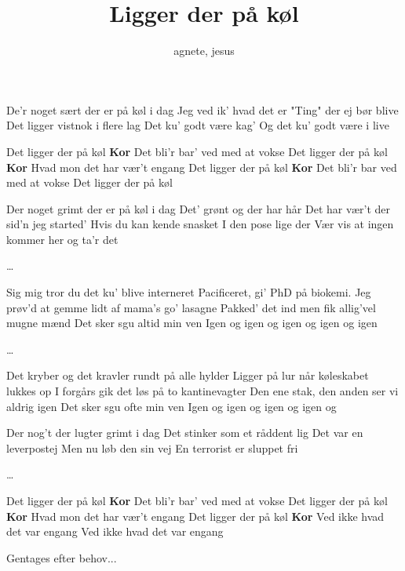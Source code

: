 \documentclass[danish]{article}
\title{Ligger der på køl}
\author{agnete, jesus}
\begin{document}
\twocolumn[
\maketitle
]

\begin{song}

 De'r noget sært der er på køl i dag
Jeg ved ik' hvad det er
"Ting" der ej bør blive
Det ligger vistnok i flere lag
Det ku' godt være kag'
Og det ku' godt være i live

 Det ligger der på køl
\textbf{Kor} Det bli'r bar' ved med at vokse
Det ligger der på køl
\textbf{Kor} Hvad mon det har vær't engang
Det ligger der på køl
\textbf{Kor} Det bli'r bar ved med at vokse
Det ligger der på køl

 Der noget grimt der er på køl i dag
Det' grønt og der har hår
Det har vær't der sid'n jeg started'
Hvis du kan kende snasket
I den pose lige der
Vær vis at ingen kommer her og ta'r det

 \ldots{}

 Sig mig tror du det ku' blive interneret
Pacificeret, gi' PhD på biokemi.
Jeg prøv'd at gemme lidt af mama's go' lasagne
Pakked' det ind men fik allig'vel mugne mænd
Det sker sgu altid min ven
Igen og igen og igen og igen og igen

 \ldots{}

 Det kryber og det kravler rundt på alle hylder
Ligger på lur når køleskabet lukkes op
I forgårs gik det løs på to kantinevagter
Den ene stak, den anden ser vi aldrig igen
Det sker sgu ofte min ven
Igen og igen og igen og igen og

 Der nog't der lugter grimt i dag
Det stinker som et råddent lig
Det var en leverpostej
Men nu løb den sin vej
En terrorist er sluppet fri

 \ldots{}

 Det ligger der på køl
\textbf{Kor} Det bli'r bar' ved med at vokse
Det ligger der på køl
\textbf{Kor} Hvad mon det har vær't engang
Det ligger der på køl
\textbf{Kor} Ved ikke hvad det var engang
Ved ikke hvad det var engang

\scene Gentages efter behov...

\end{song}
\end{document}

